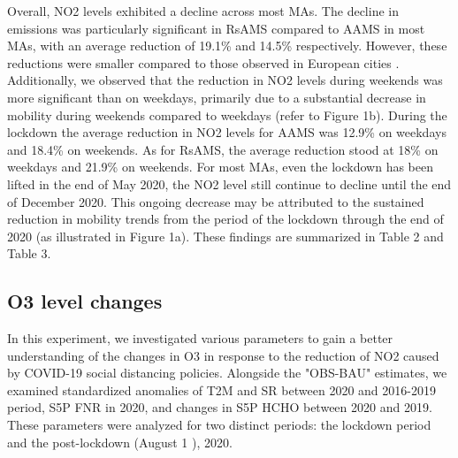 Overall, NO2 levels exhibited a decline across most MAs. The decline in emissions was particularly significant in RsAMS compared to AAMS in most MAs, with an average reduction of 19.1\% and 14.5\% respectively. However, these reductions were smaller compared to those observed in European cities \citep{barre2021estimating,grange2021covid}. Additionally, we observed that the reduction in NO2 levels during weekends was more significant than on weekdays, primarily due to a substantial decrease in mobility during weekends compared to weekdays (refer to Figure 1b). During the lockdown the average reduction in NO2 levels for AAMS was 12.9\% on weekdays and 18.4\% on weekends. As for RsAMS, the average reduction stood at 18\% on weekdays and 21.9\% on weekends. For most MAs, even the lockdown has been lifted in the end of May 2020, the NO2 level still continue to decline until the end of December 2020. This ongoing decrease may be attributed to the sustained reduction in mobility trends from the period of the lockdown through the end of 2020 (as illustrated in Figure 1a). These findings are summarized in Table 2 and Table 3. \par

\subsection{O3 level changes}
In this experiment, we investigated various parameters to gain a better understanding of the changes in O3 in response to the reduction of NO2 caused by COVID-19 social distancing policies. Alongside the "OBS-BAU" estimates, we examined standardized anomalies of T2M and SR between 2020 and 2016-2019 period, S5P FNR in 2020, and changes in S5P HCHO between 2020 and 2019. These parameters were analyzed for two distinct periods: the lockdown period and the post-lockdown (August 1 ), 2020. \par

